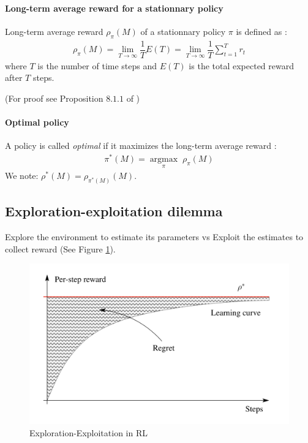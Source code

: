 \documentclass[a4paper,10pt]{article}
\newcommand{\argmax}[1]{\underset{#1}{\operatorname{argmax}}\;}
\begin{document}
\paragraph{Long-term average reward for a stationnary policy\\}
Long-term average reward $\rho_{\pi}(M)$ of a stationnary policy $\pi$ is defined as : 
\begin{align*}
\rho_{\pi}(M) = \lim\limits_{T \rightarrow \infty} \dfrac{1}{T}E(T) = \lim\limits_{T \rightarrow \infty} \dfrac{1}{T}\sum\limits_{t = 1}^{T} r_t
\end{align*}
where $T$ is the number of time steps and 
$E(T)$ is the total expected reward after $T$ steps.

(For proof see Proposition $8.1.1$ of \cite{puterman2014markov})

\paragraph{Optimal policy\\}
A policy is called \textit{optimal} if it maximizes the long-term average reward : 
\begin{align*}
\pi^{*}(M) =  \argmax{\pi} \rho_{\pi}(M)
\end{align*}
We note: $\rho^{*}(M) = \rho_{\pi^{*}(M)}(M)$.

\subsection{Exploration-exploitation dilemma}
Explore the environment to estimate its parameters vs Exploit the estimates to collect reward (See Figure \ref{regret}).

\begin{figure}[h]
	\includegraphics[width=\textwidth]{regret.png}
   \caption{Exploration-Exploitation in RL}
   \label{regret}
\end{figure}
\end{document}
